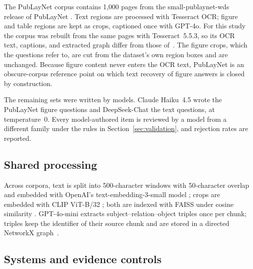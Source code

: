 \documentclass[preprint,12pt]{elsarticle}
\begin{document}


The PubLayNet corpus contains 1{,}000 pages from the small-publaynet-wds
release of PubLayNet
\cite{lhoestq_small_publaynet_wds,zhong2019publaynet}. Text regions are
processed with Tesseract OCR; figure and table regions are kept as crops,
captioned once with GPT-4o. For this study the corpus was rebuilt from the
same pages with Tesseract~5.5.3, so its OCR text, captions, and extracted graph
differ from those of~\cite{jonah2026whendo}. The figure crops, which the
questions refer to, are cut from the dataset's own region boxes and are
unchanged. Because figure content never enters the OCR text,
PubLayNet is an obscure-corpus reference point on which text recovery of
figure answers is closed by construction.

The remaining sets were written by models. Claude Haiku~4.5 wrote the
PubLayNet figure questions and DeepSeek-Chat the text questions, at
temperature~0. Every
model-authored item is reviewed by a model from a different family under the
rules in Section~\ref{sec:validation}, and rejection rates are reported.

\subsection{Shared processing}

Across corpora, text is split into 500-character windows with 50-character
overlap and embedded with OpenAI's text-embedding-3-small model
\cite{openai2024embeddings}; crops are embedded with CLIP ViT-B/32
\cite{radford2021clip}; both are indexed with FAISS under cosine similarity
\cite{johnson2019faiss}. GPT-4o-mini extracts subject--relation--object
triples once per chunk; triples keep the identifier of their source chunk and
are stored in a directed NetworkX graph~\cite{hagberg2008networkx}.

\subsection{Systems and evidence controls}
\label{sec:systems}
\end{document}
